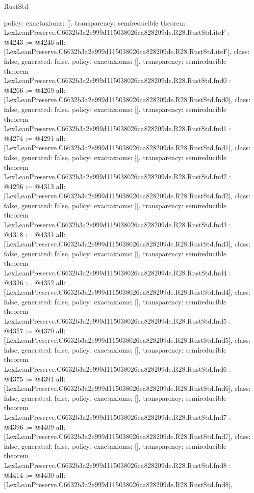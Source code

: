 \begin{lexlean}{RustStd}
\begin{coremodule}
{  policy: exact{axioms: []},
  transparency: semireducible
}
theorem LexLeanPreserve.C6632b3a2e999d115038026ca828209de.R28.RustStd.iteF : @4243 := @4246 {
  all: [LexLeanPreserve.C6632b3a2e999d115038026ca828209de.R28.RustStd.iteF],
  class: false,
  generated: false,
  policy: exact{axioms: []},
  transparency: semireducible
}
theorem LexLeanPreserve.C6632b3a2e999d115038026ca828209de.R28.RustStd.fnd0 : @4266 := @4269 {
  all: [LexLeanPreserve.C6632b3a2e999d115038026ca828209de.R28.RustStd.fnd0],
  class: false,
  generated: false,
  policy: exact{axioms: []},
  transparency: semireducible
}
theorem LexLeanPreserve.C6632b3a2e999d115038026ca828209de.R28.RustStd.fnd1 : @4274 := @4291 {
  all: [LexLeanPreserve.C6632b3a2e999d115038026ca828209de.R28.RustStd.fnd1],
  class: false,
  generated: false,
  policy: exact{axioms: []},
  transparency: semireducible
}
theorem LexLeanPreserve.C6632b3a2e999d115038026ca828209de.R28.RustStd.fnd2 : @4296 := @4313 {
  all: [LexLeanPreserve.C6632b3a2e999d115038026ca828209de.R28.RustStd.fnd2],
  class: false,
  generated: false,
  policy: exact{axioms: []},
  transparency: semireducible
}
theorem LexLeanPreserve.C6632b3a2e999d115038026ca828209de.R28.RustStd.fnd3 : @4318 := @4331 {
  all: [LexLeanPreserve.C6632b3a2e999d115038026ca828209de.R28.RustStd.fnd3],
  class: false,
  generated: false,
  policy: exact{axioms: []},
  transparency: semireducible
}
theorem LexLeanPreserve.C6632b3a2e999d115038026ca828209de.R28.RustStd.fnd4 : @4336 := @4352 {
  all: [LexLeanPreserve.C6632b3a2e999d115038026ca828209de.R28.RustStd.fnd4],
  class: false,
  generated: false,
  policy: exact{axioms: []},
  transparency: semireducible
}
theorem LexLeanPreserve.C6632b3a2e999d115038026ca828209de.R28.RustStd.fnd5 : @4357 := @4370 {
  all: [LexLeanPreserve.C6632b3a2e999d115038026ca828209de.R28.RustStd.fnd5],
  class: false,
  generated: false,
  policy: exact{axioms: []},
  transparency: semireducible
}
theorem LexLeanPreserve.C6632b3a2e999d115038026ca828209de.R28.RustStd.fnd6 : @4375 := @4391 {
  all: [LexLeanPreserve.C6632b3a2e999d115038026ca828209de.R28.RustStd.fnd6],
  class: false,
  generated: false,
  policy: exact{axioms: []},
  transparency: semireducible
}
theorem LexLeanPreserve.C6632b3a2e999d115038026ca828209de.R28.RustStd.fnd7 : @4396 := @4409 {
  all: [LexLeanPreserve.C6632b3a2e999d115038026ca828209de.R28.RustStd.fnd7],
  class: false,
  generated: false,
  policy: exact{axioms: []},
  transparency: semireducible
}
theorem LexLeanPreserve.C6632b3a2e999d115038026ca828209de.R28.RustStd.fnd8 : @4414 := @4430 {
  all: [LexLeanPreserve.C6632b3a2e999d115038026ca828209de.R28.RustStd.fnd8],
}
\end{coremodule}
\end{lexlean}
